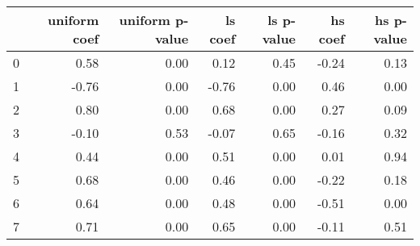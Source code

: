 \begin{tabular}{lrrrrrr}
\toprule
 & uniform coef & uniform p-value & ls coef & ls p-value & hs coef & hs p-value \\
\midrule
0 & 0.58 & 0.00 & 0.12 & 0.45 & -0.24 & 0.13 \\
1 & -0.76 & 0.00 & -0.76 & 0.00 & 0.46 & 0.00 \\
2 & 0.80 & 0.00 & 0.68 & 0.00 & 0.27 & 0.09 \\
3 & -0.10 & 0.53 & -0.07 & 0.65 & -0.16 & 0.32 \\
4 & 0.44 & 0.00 & 0.51 & 0.00 & 0.01 & 0.94 \\
5 & 0.68 & 0.00 & 0.46 & 0.00 & -0.22 & 0.18 \\
6 & 0.64 & 0.00 & 0.48 & 0.00 & -0.51 & 0.00 \\
7 & 0.71 & 0.00 & 0.65 & 0.00 & -0.11 & 0.51 \\
\bottomrule
\end{tabular}
